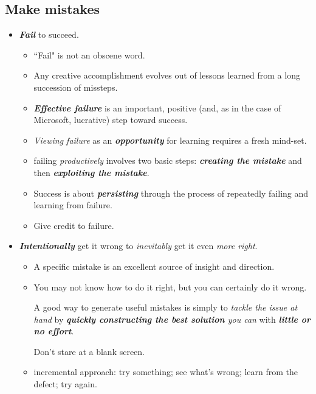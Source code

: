\documentclass[11pt]{article}
\begin{document}
\subsection{Make mistakes}
\begin{itemize}
\item \emph{\textbf{Fail}} to succeed. 
\begin{itemize}
\item ``Fail" is not an obscene word.

\item Any creative accomplishment evolves out of lessons learned from a long succession of missteps.

\item \emph{\textbf{Effective failure}} is an important, positive (and, as in the case of Microsoft, lucrative) step toward success.

\item \emph{Viewing failure} as an \emph{\textbf{opportunity}} for learning requires a fresh mind-set.

\item failing \emph{productively} involves two basic steps: \emph{\textbf{creating the mistake}} and then \emph{\textbf{exploiting the mistake}}.

\item Success is about \emph{\textbf{persisting}} through the process of repeatedly failing and learning from failure.

\item Give credit to failure.
\end{itemize}

\item \emph{\textbf{Intentionally}} get it wrong to \emph{inevitably} get it even \emph{more right}. 
\begin{itemize}
\item A specific mistake is an excellent source of insight and direction.

\item You may not know how to do it right, but you can certainly do it wrong.

A good way to generate useful mistakes is simply to \emph{tackle the issue at hand} by \emph{\textbf{quickly constructing the best solution} you can} with \emph{\textbf{little or no effort}}.

Don’t stare at a blank screen.

\item incremental approach: try something; see what’s wrong; learn from the defect; try again.


\end{itemize}
\end{itemize}
\end{document}
